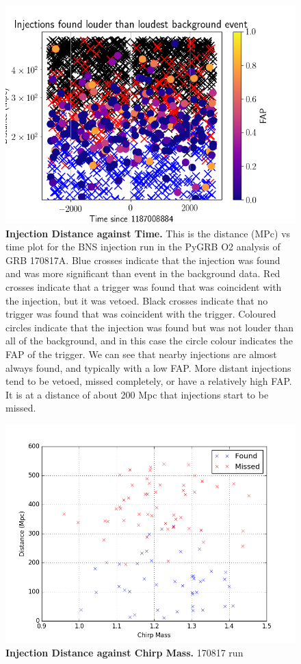 \documentclass[11pt]{cuthesis}
\begin{document}
\begin{figure} %
\begin{center}
\includegraphics[width=0.8\linewidth]{found_missed_injections_dist_time.png}
\end{center}
\caption{\textbf{Injection Distance against Time.} This is the distance (MPc) vs time plot for the BNS injection run in the PyGRB O2 analysis of GRB 170817A. Blue crosses indicate that the injection was found and was more significant than event in the background data. Red crosses indicate that a trigger was found that was coincident with the injection, but it was vetoed. Black crosses indicate that no trigger was found that was coincident with the trigger. Coloured circles indicate that the injection was found but was not louder than all of the background, and in this case the circle colour indicates the FAP of the trigger. We can see that nearby injections are almost always found, and typically with a low FAP. More distant injections tend to be vetoed, missed completely, or have a relatively high FAP. It is at a distance of about 200 Mpc that injections start to be missed.} 
\label{fig:old inj dist time}
\end{figure}

\begin{figure} %
\begin{center}
\includegraphics[width=0.8\linewidth]{mchirp_distance_inj.png}
\end{center}
\caption{\textbf{Injection Distance against Chirp Mass.} 170817 run} 
\label{fig:inj dist mchirp}
\end{figure}
\end{document}
